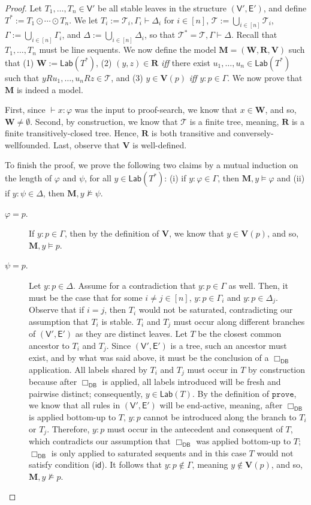 \documentclass[copyright,creativecommons]{eptcs}
\newcommand{\tel}{\mathcal{T}}
\newcommand{\iffi}{\textit{iff} }
\renewcommand{\phi}{\varphi}
\newcommand{\lab}{\mathsf{Lab}}
\newcommand{\id}{\mathsf{id}}
\newcommand{\sar}{\vdash}
\newcommand{\tseq}{T} %
\newcommand{\prove}{\mathtt{prove}}
\newcommand{\ndrule}{\Box_\mathsf{DB}}
\newcommand{\ctv}{\mathsf{V}}
\newcommand{\cte}{\mathsf{E}}
\newcommand{\scomp}{\odot}
\newcommand{\M}{\mathbf{M}}
\newcommand{\W}{\mathbf{W}}
\newcommand{\R}{\mathbf{R}}
\newcommand{\V}{\mathbf{V}}
\begin{document}
\begin{proof}
Let $\tseq_{1}, \ldots, \tseq_{n} \in \ctv'$ be all stable leaves in the structure $(\ctv',\cte')$, and define $\tseq^{*} := \tseq_{1} \scomp \cdots \scomp \tseq_{n}$. We let $\tseq_{i} := \tel_{i}, \Gamma_{i} \sar \Delta_{i}$ for $i \in [n]$, $\tel := \bigcup_{i \in [n]} \tel_{i}$, $\Gamma := \bigcup_{i \in [n]} \Gamma_{i}$, and $\Delta := \bigcup_{i \in [n]} \Delta_{i}$, so that $\tel^{*} = \tel, \Gamma \sar \Delta$. Recall that $\tseq_{1}, \ldots, \tseq_{n}$ must be line sequents. We now define the model $\M = (\W,\R,\V)$ such that (1) $\W := \lab(\tseq^{*})$, (2) $(y,z) \in \R$ \iffi there exist $u_{1}, \ldots, u_{n} \in \lab(\tseq^{*})$ such that $yRu_{1}, \ldots, u_{n}Rz \in \tel$, and (3) $y \in \V(p)$ \iffi $y : p \in \Gamma$. We now prove that $\M$ is indeed a model. 

First, since $\sar x : \phi$ was the input to proof-search, we know that $x \in \W$, and so, $\W \neq \emptyset$. Second, by construction, we know that $\tel$ is a finite tree, meaning, $\R$ is a finite transitively-closed tree. Hence, $\R$ is both transitive and conversely-wellfounded. Last, observe that $\V$ is well-defined. 

To finish the proof, we prove the following two claims by a mutual induction on the length of $\phi$ and $\psi$, for all $y \in \lab(\tseq^{*})$: (i) if $y : \phi \in \Gamma$, then $\M, y \models \phi$ and (ii) if $y : \psi \in \Delta$, then $\M, y \not\models \psi$.
\begin{description}

\item[$\phi = p.$] If $y : p \in \Gamma$, then by the definition of $\V$, we know that $y \in \V(p)$, and so, $\M, y \models p$.

\item[$\psi = p.$] Let $y : p \in \Delta$. Assume for a contradiction that $y : p \in \Gamma$ as well. Then, it must be the case that for some $i \neq j \in [n]$, $y : p \in \Gamma_{i}$ and $y : p \in \Delta_{j}$. Observe that if $i = j$, then $\tseq_{i}$ would not be saturated, contradicting our assumption that $\tseq_{i}$ is stable. $\tseq_{i}$ and $\tseq_{j}$ must occur along different branches of $(\ctv',\cte')$ as they are distinct leaves. Let $\tseq$ be the closest common ancestor to $\tseq_{i}$ and $\tseq_{j}$. Since $(\ctv',\cte')$ is a tree, such an ancestor must exist, and by what was said above, it must be the conclusion of a $\ndrule$ application. All labels shared by $\tseq_{i}$ and $\tseq_{j}$ must occur in $\tseq$ by construction because after $\ndrule$ is applied, all labels introduced will be fresh and pairwise distinct; consequently, $y \in \lab(\tseq)$. By the definition of $\prove$, we know that all rules in $(\ctv',\cte')$ will be end-active, meaning, after $\ndrule$ is applied bottom-up to $\tseq$, $y : p$ cannot be introduced along the branch to $\tseq_{i}$ or $\tseq_{j}$. Therefore, $y : p$ must occur in the antecedent and consequent of $\tseq$, which contradicts our assumption that $\ndrule$ was applied bottom-up to $\tseq$; $\ndrule$ is only applied to saturated sequents and in this case $\tseq$ would not satisfy condition ($\id$). It follows that $y : p \not\in \Gamma$, meaning $y \not\in \V(p)$, and so, $\M, y \not\models p$.


\end{description}
\end{proof}
\end{document}
